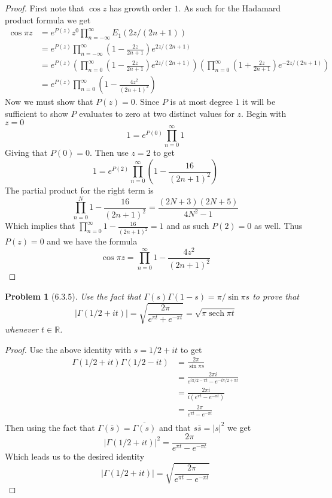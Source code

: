 \documentclass[10pt]{article}
\newcommand{\sk}{\vskip 6mm}
\newcommand{\bb}[1]{\mathbb{#1}}
\DeclareMathOperator{\sech}{sech}
\theoremstyle{plain}
\newtheorem{problem}{Problem}
\theoremstyle{remark}
\begin{document}
\begin{proof}
  First note that $\cos z$ has growth order $1$. As such for the Hadamard
  product formula we get
  \begin{align*}
    \cos\pi z&=e^{P\left(z\right)}z^0\prod_{n=-\infty}^\infty E_1\left(2z/\left(2n+1\right)\right)\\
           &=e^{P\left(z\right)}\prod_{n=-\infty}^\infty \left(1-\frac{2z}{2n+1}\right)e^{2z/\left(2n+1\right)}\\
           &=e^{P\left(z\right)}\left(\prod_{n=0}^\infty \left(1-\frac{2z}{2n+1}\right)e^{2z/\left(2n+1\right)}\right)\left(\prod_{n=0}^\infty \left(1+\frac{2z}{2n+1}\right)e^{-2z/\left(2n+1\right)}\right)\\
           &=e^{P\left(z\right)}\prod_{n=0}^\infty\left(1-\frac{4z^2}{\left(2n+1\right)^2}\right)
  \end{align*}
  Now we must show that $P\left(z\right)=0$. Since $P$ is at most degree $1$
  it will be sufficient to show $P$ evaluates to zero at two distinct
  values for $z$. Begin with $z=0$
  \[
    1=e^{P\left(0\right)}\prod_{n=0}^\infty 1
  \]
  Giving that $P\left(0\right)=0$. Then use $z=2$ to get
  \[
    1=e^{P\left(2\right)}\prod_{n=0}^\infty\left(1-\frac{16}{\left(2n+1\right)^2}\right)
  \]
  The partial product for the right term is
  \[
    \prod_{n=0}^N1-\frac{16}{\left(2n+1\right)^2}=\frac{\left(2N+3\right)\left(2N+5\right)}{4N^2-1}
  \]
  Which implies that $\prod_{n=0}^\infty 1-\frac{16}{\left(2n+1\right)^2}=1$ and as
  such $P\left(2\right)=0$ as well. Thus $P\left(z\right)=0$ and we have the formula
  \[
    \cos\pi z=\prod_{n=0}^\infty 1-\frac{4z^2}{\left(2n+1\right)^2}
  \]
\end{proof}

\sk

\begin{problem}[6.3.5]
  Use the fact that $\Gamma\left(s\right)\Gamma\left(1-s\right)=\pi/\sin\pi s$ to prove that
  \[
    |\Gamma\left(1/2+it\right)|=\sqrt{\frac{2\pi}{e^{\pi t}+e^{-\pi t}}}=\sqrt{\pi\sech{\pi t}}
  \]
  whenever $t\in \bb{R}$.
\end{problem}

\begin{proof}
  Use the above identity with $s=1/2+it$ to get
  \begin{align*}
    \Gamma\left(1/2+it\right)\Gamma\left(1/2-it\right) &= \frac{2\pi}{\sin\pi s}\\
                       &= \frac{2\pi i}{e^{i\pi/2-\pi t}-e^{-i\pi/2+\pi t}}\\
                       &= \frac{2\pi i}{i\left(e^{\pi t}-e^{-\pi t}\right)}\\
                       &= \frac{2\pi}{e^{\pi t}-e^{-\pi t}}\\
  \end{align*}
  Then using the fact that $\Gamma\left(\bar{s}\right)=\overline{\Gamma\left(s\right)}$ and
  that $s\bar{s}=|s|^2$ we get
  \[
    |\Gamma\left(1/2+it\right)|^2=\frac{2\pi}{e^{\pi t}-e^{-\pi t}}
  \]
  Which leads us to the desired identity
  \[
    |\Gamma\left(1/2+it\right)|=\sqrt{\frac{2\pi}{e^{\pi t}-e^{-\pi t}}}
  \]
\end{proof}
\end{document}
